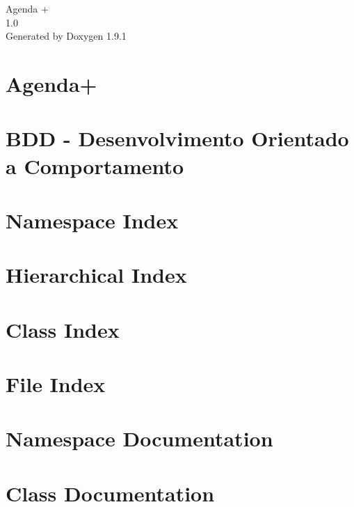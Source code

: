 \let\mypdfximage\pdfximage\def\pdfximage{\immediate\mypdfximage}\documentclass[twoside]{book}
\newcommand{\+}{\discretionary{\mbox{\scriptsize$\hookleftarrow$}}{}{}}
\newcommand{\clearemptydoublepage}{%
  \newpage{\pagestyle{empty}\cleardoublepage}%
}
\begin{document}
\raggedbottom

\hypersetup{pageanchor=false,
             bookmarksnumbered=true,
             pdfencoding=unicode
            }
\begin{titlepage}
\vspace*{7cm}
\begin{center}%
{\Large Agenda + \\[1ex]\large 1.\+0 }\\
\vspace*{1cm}
{\large Generated by Doxygen 1.9.1}\\
\end{center}
\end{titlepage}
\clearemptydoublepage
{}
\tableofcontents
\clearemptydoublepage
{}
\hypersetup{pageanchor=true}

\chapter{Agenda+}
\label{index}\hypertarget{index}{}
\chapter{BDD -\/ Desenvolvimento Orientado a Comportamento}
\label{tests_bdd}

\chapter{Namespace Index}

\chapter{Hierarchical Index}

\chapter{Class Index}

\chapter{File Index}

\chapter{Namespace Documentation}

\chapter{Class Documentation}



























\end{document}
